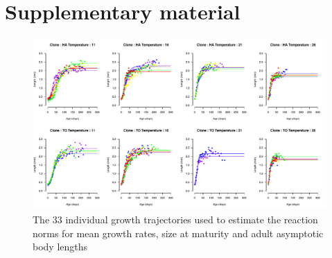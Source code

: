 \newpage
\section{Supplementary material}

\begin{figure}[!ht] %
\centering
\includegraphics[width=0.88\textheight,angle=90]{5_ChapExp3/fig/FigS1}
\caption[Individual growth trajectories]{
The 33 individual growth trajectories used to estimate the reaction norms for mean growth rates, size at maturity and adult asymptotic body lengths}
\label{Fig5-S1}
\end{figure}


